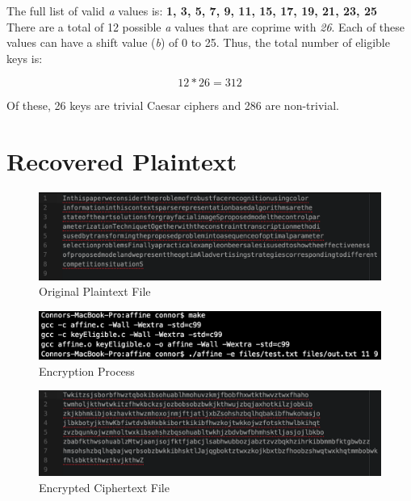\documentclass[]{article}
\begin{document}
\vspace{0.5cm}

The full list of valid \textit{a} values is: \textbf{1, 3, 5, 7, 9, 11, 15, 17, 19, 21, 23, 25}\\

There are a total of 12 possible \textit{a} values that are coprime with \textit{26}. Each of these values can have a shift value (\textit{b}) of 0 to 25. Thus, the total number of eligible keys is:

$$12*26=312$$

Of these, 26 keys are trivial Caesar ciphers and 286 are non-trivial.

\section*{Recovered Plaintext}

\begin{figure}[H]
	\includegraphics[width=\textwidth]{affine_plaintext.png}
	\caption{Original Plaintext File}
	\centering
\end{figure}

\begin{figure}[H]
	\includegraphics[width=\textwidth]{affine_encrypt.png}
	\caption{Encryption Process}
	\centering
\end{figure}

\begin{figure}[H]
	\includegraphics[width=\textwidth]{affine_ciphertext.png}
	\caption{Encrypted Ciphertext File}
	\centering
\end{figure}
\end{document}
